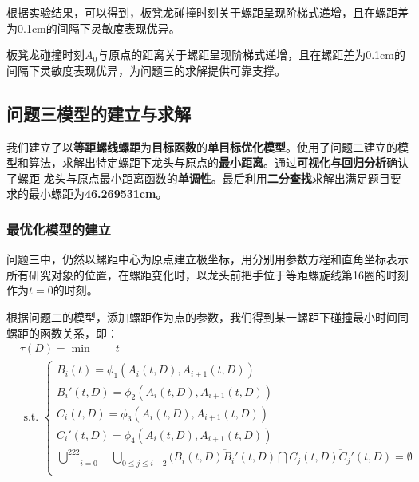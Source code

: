 \documentclass[a4paper]{article}
\begin{document}
根据实验结果，可以得到，板凳龙碰撞时刻关于螺距呈现阶梯式递增，且在螺距差为0.1cm的间隔下灵敏度表现优异。

板凳龙碰撞时刻$A_0$与原点的距离关于螺距呈现阶梯式递增，且在螺距差为0.1cm的间隔下灵敏度表现优异，为问题三的求解提供可靠支撑。
	\subsection{问题三模型的建立与求解}
 我们建立了以\textbf{等距螺线螺距}为\textbf{目标函数}的\textbf{单目标优化模型}。使用了问题二建立的模型和算法，求解出特定螺距下龙头与原点的\textbf{最小距离}。通过\textbf{可视化与回归分析}确认了螺距-龙头与原点最小距离函数的\textbf{单调性}。最后利用\textbf{二分查找}求解出满足题目要求的最小螺距为\textbf{46.269531cm}。
	\subsubsection{最优化模型的建立}
 问题三中，仍然以螺距中心为原点建立极坐标，用分别用参数方程和直角坐标表示所有研究对象的位置，在螺距变化时，以龙头前把手位于等距螺旋线第16圈的时刻作为$t = 0$的时刻。

 根据问题二的模型，添加螺距作为点的参数，我们得到某一螺距下碰撞最小时间同螺距的函数关系，即：
 		\begin{equation}
   \begin{aligned}
				& \tau(D) = \min \quad \quad t \\
				& \text { s.t. }\left\{\begin{array}{l}
                        B_i(t) = \phi_1(A_i(t, D), A_{i + 1}(t, D))\\
                        B_{i}'(t, D) = \phi_2(A_i(t, D), A_{i + 1}(t, D))\\
                        C_i(t, D) = \phi_3(A_i(t, D), A_{i + 1}(t, D))\\
                        C_{i}'(t, D) = \phi_4(A_i(t, D), A_{i + 1}(t, D))\\
               \underset{i=0}{\overset{222}{\bigcup}}\quad \underset{0\leq j \leq i - 2}{\bigcup}(\overline{B_i(t, D)B_{i}'(t, D)}\bigcap \overline{C_j(t,D)C_{j}'(t, D)} = \emptyset

  \\

				\end{array}\right.
    \end{aligned}
		\end{equation}
\end{document}
